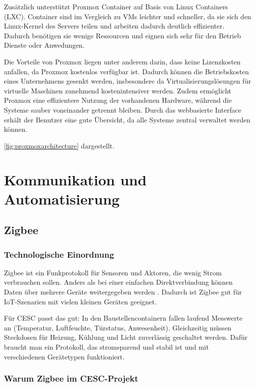 Zusätzlich unterstützt Proxmox Container auf Basis von Linux Containers (LXC). Container sind im Vergleich zu VMs leichter und schneller, da sie sich den Linux-Kernel des Servers teilen und arbeiten dadurch deutlich effizienter. Dadurch benötigen sie wenige Ressourcen und eignen sich sehr für den Betrieb Dienste oder Anwedungen.

Die Vorteile von Proxmox liegen unter anderem darin, dass keine Lizenzkosten anfallen, da Proxmox kostenlos verfügbar ist. Dadurch können die Betriebskosten eines Unternehmens gesenkt werden, insbesondere da Virtualisierungslösungen für virtuelle Maschinen zunehmend kostenintensiver werden. Zudem ermöglicht Proxmox eine effizientere Nutzung der vorhandenen Hardware, während die Systeme sauber voneinander getrennt bleiben. Durch das webbasierte Interface erhält der Benutzer eine gute Übersicht, da alle Systeme zentral verwaltet werden können.


\ref{fig:proxmoxarchitecture} dargestellt.



\section{Kommunikation und Automatisierung}
\subsection{Zigbee}

\subsubsection{Technologische Einordnung}

Zigbee ist ein Funkprotokoll für Sensoren und Aktoren, die wenig Strom verbrauchen sollen. Anders als bei einer einfachen Direktverbindung können Daten über mehrere Geräte weitergegeben werden \cite{csa_zigbee_overview}. Dadurch ist Zigbee gut für IoT-Szenarien mit vielen kleinen Geräten geeignet.

Für CESC passt das gut: In den Baustellencontainern fallen laufend Messwerte an (Temperatur, Luftfeuchte, Türstatus, Anwesenheit). Gleichzeitig müssen Steckdosen für Heizung, Kühlung und Licht zuverlässig geschaltet werden. Dafür braucht man ein Protokoll, das stromsparend und stabil ist und mit verschiedenen Gerätetypen funktioniert.

\subsubsection{Warum Zigbee im CESC-Projekt}

